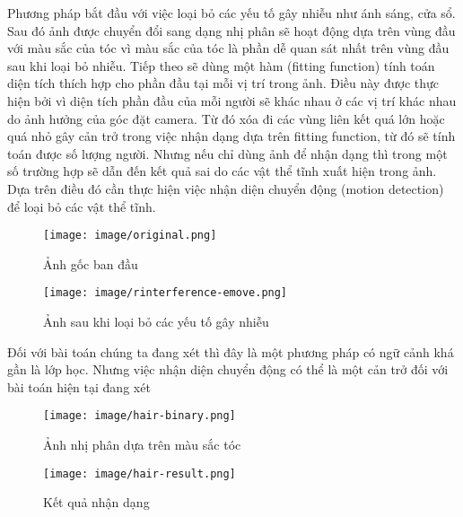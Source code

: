 \documentclass[12pt,a4paper]{article}
\begin{document}
Phương pháp bắt đầu với việc loại bỏ các yếu tố gây nhiễu như ánh sáng, cửa sổ. Sau đó ảnh được chuyển đổi sang dạng nhị phân sẽ hoạt động dựa trên vùng đầu với màu sắc của tóc vì màu sắc của tóc là phần dễ quan sát nhất trên vùng đầu sau khi loại bỏ nhiễu. Tiếp theo sẽ dùng một hàm (fitting function) tính toán diện tích thích hợp cho phần đầu tại mỗi vị trí trong ảnh. Điều này được thực hiện bởi vì diện tích phần đầu của mỗi người sẽ khác nhau ở các vị trí khác nhau do ảnh hưởng của góc đặt camera. Từ đó xóa đi các vùng liên kết quá lớn hoặc quá nhỏ gây cản trở trong việc nhận dạng dựa trên fitting function, từ đó sẽ tính toán được số lượng người. Nhưng nếu chỉ dùng ảnh để nhận dạng thì trong một số trường hợp sẽ dẫn đến kết quả sai do các vật thể tĩnh xuất hiện trong ảnh. Dựa trên điều đó cần thực hiện việc nhận diện chuyển động (motion detection) để loại bỏ các vật thể tĩnh.\\

\begin{figure}[!htb]
   \begin{minipage}{0.5\textwidth}
     \centering
     \texttt{[image: image/original.png]}
     \caption{Ảnh gốc ban đầu \cite{Base global feature}}\label{Fig:class1}
   \end{minipage}\hfill
   \begin{minipage}{0.5\textwidth}
     \centering
     \texttt{[image: image/rinterference-emove.png]}
     \caption{Ảnh sau khi loại bỏ các yếu tố gây nhiễu \cite{Base global feature}}\label{Fig:class2}
   \end{minipage}
\end{figure}

Đối với bài toán chúng ta đang xét thì đây là một phương pháp có ngữ cảnh khá gần là lớp học. Nhưng việc nhận diện chuyển động có thể là một cản trở đối với bài toán hiện tại đang xét
\begin{figure}[!htb]
   \begin{minipage}{0.5\textwidth}
     \centering
     \texttt{[image: image/hair-binary.png]}
     \caption{Ảnh nhị phân dựa trên màu sắc tóc \cite{Base global feature}}\label{Fig:hair1}
   \end{minipage}\hfill
   \begin{minipage}{0.5\textwidth}
     \centering
     \texttt{[image: image/hair-result.png]}
     \caption{Kết quả nhận dạng \cite{Base global feature}}\label{Fig:hair2}
   \end{minipage}
\end{figure}
\end{document}
